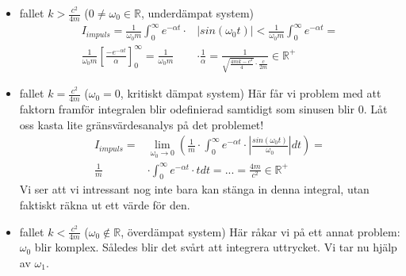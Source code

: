 \documentclass[10pt,a4paper]{article}
\begin{document}
\begin{itemize}
\item fallet $k>\frac{c^2}{4m}$ ($0\neq\omega_0 \in \mathbb{R}$, underdämpat system)
\begin{equation}
\begin{split}
I_{impuls}=\frac{1}{\omega_0  m}\int_{0}^{\infty}e^{-\alpha t}\cdot & | sin(\omega_0 t)|<\frac{1}{\omega_0  m}\int_{0}^{\infty}e^{-\alpha t}=\\\frac{1}{\omega_0  m} \left[\frac{-e^{-\alpha t}}{\alpha}\right]_0^\infty= \frac{1}{\omega_0  m} & \cdot \frac{1}{\alpha}=\frac{1}{\sqrt{\frac{4 m k- c^2}{4}}\cdot\frac{c}{2m}}\in \mathbb{R}^+
\end{split}
\end{equation}
\item fallet $k=\frac{c^2}{4m}$ ($\omega_0=0$, kritiskt dämpat system)
\newline 
Här får vi problem med att faktorn framför integralen blir odefinierad samtidigt som sinusen blir 0. Låt oss kasta lite gränsvärdesanalys på det problemet!
\begin{equation}
\begin{split}
I_{impuls}= & \lim_{\omega_0\to0}\left(\frac{1}{m} \cdot \int_{0}^{\infty}e^{-\alpha t}\cdot |\frac{sin(\omega_0 t)}{\omega_0}|dt\right) = \\ \frac{1}{m} &\cdot\int_{0}^{\infty}e^{-\alpha t} \cdot t  dt=...=\frac{4m}{c^2}\in \mathbb{R}^+
\end{split}
\end{equation}
Vi ser att vi intressant nog inte bara kan stänga in denna integral, utan faktiskt räkna ut ett värde för den.
\item fallet $k<\frac{c^2}{4m}$ ($\omega_0 \notin \mathbb{R}$, överdämpat system)
\newline Här råkar vi på ett annat problem: $\omega_0$ blir komplex. Således blir det svårt att integrera uttrycket. Vi tar nu hjälp av $\omega_1$.


\end{itemize}
\end{document}
